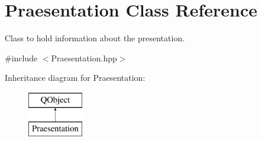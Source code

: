 \hypertarget{class_praesentation}{}\section{Praesentation Class Reference}
\label{class_praesentation}


Class to hold information about the presentation.  




{\ttfamily \#include $<$Praesentation.\+hpp$>$}

Inheritance diagram for Praesentation\+:\begin{figure}[H]
\begin{center}
\leavevmode
\includegraphics[height=2.000000cm]{class_praesentation}
\end{center}
\end{figure}
